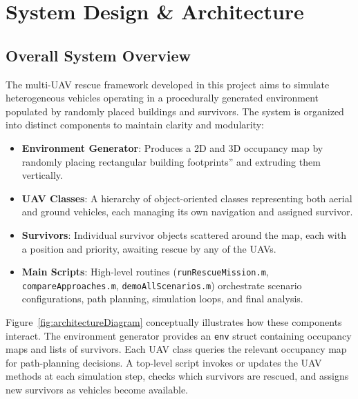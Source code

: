 \documentclass[12pt,a4paper]{report}
\begin{document}
\chapter{System Design \& Architecture}
\label{cha:system_design}

\section{Overall System Overview}
\label{sec:system_overview}
The multi-UAV rescue framework developed in this project aims to simulate heterogeneous vehicles 
operating in a procedurally generated environment populated by randomly placed buildings and 
survivors. The system is organized into distinct components to maintain clarity and modularity:

\begin{itemize}
    \item \textbf{Environment Generator}:
          Produces a 2D and 3D occupancy map by randomly placing rectangular building footprints'' 
          and extruding them vertically.
    \item \textbf{UAV Classes}:
          A hierarchy of object-oriented classes representing both aerial and ground vehicles, 
          each managing its own navigation and assigned survivor.
    \item \textbf{Survivors}:
          Individual survivor objects scattered around the map, each with a position and priority, 
          awaiting rescue by any of the UAVs.
    \item \textbf{Main Scripts}:
          High-level routines (\texttt{runRescueMission.m}, \texttt{compareApproaches.m}, 
          \texttt{demoAllScenarios.m}) orchestrate scenario configurations, path planning, 
          simulation loops, and final analysis.
\end{itemize}

Figure~\ref{fig:architectureDiagram} conceptually illustrates how these components 
interact. The environment generator provides an \texttt{env} struct containing occupancy maps and 
lists of survivors. Each UAV class queries the relevant occupancy map for path-planning decisions. 
A top-level script invokes or updates the UAV methods at each simulation step, checks which survivors 
are rescued, and assigns new survivors as vehicles become available.
\end{document}
